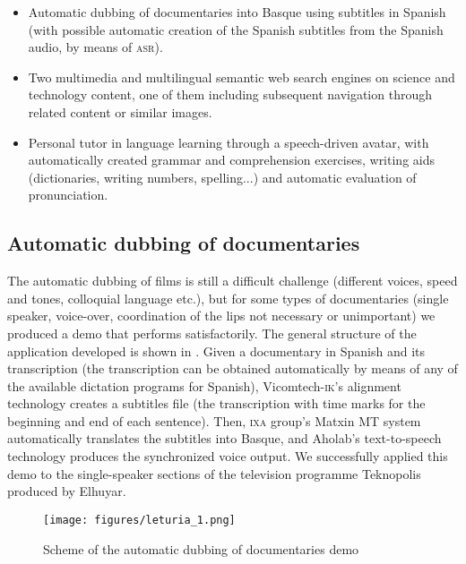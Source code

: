 \documentclass[output=paper]{LSP/langsci}
\begin{document}
\largerpage
\begin{itemize}
\item 
Automatic dubbing of documentaries into Basque using subtitles in Spanish (with possible automatic creation of the Spanish subtitles from the Spanish audio, by means of \textsc{asr}).
\item  
Two multimedia and multilingual semantic web search engines on science and technology content, one of them including subsequent navigation through related content or similar images.
\item 
Personal tutor in language learning through a speech-driven avatar, with automatically created grammar and comprehension exercises, writing aids (dictionaries, writing numbers, spelling...) and automatic evaluation of pronunciation.
\end{itemize}

\subsection{Automatic dubbing of documentaries}\label{sec:leturia:5.1}

The automatic dubbing of films is still a difficult challenge (different voices, speed and tones, colloquial language etc.), but for some types of documentaries (single speaker, voice-over, coordination of the lips not necessary or unimportant) we produced a demo that performs satisfactorily. The general structure of the application developed is shown in . Given a documentary in Spanish and its transcription (the transcription can be obtained automatically by means of any of the available dictation programs for Spanish), Vicomtech-\textsc{ik}'s alignment technology creates a subtitles file (the transcription with time marks for the beginning and end of each sentence). Then, \textsc{ixa} group's Matxin MT system automatically translates the subtitles into Basque, and Aholab's text-to-speech technology produces the synchronized voice output. We successfully applied this demo to the single-speaker sections of the television programme Teknopolis produced by Elhuyar.

\begin{figure}[h]
\texttt{[image: figures/leturia\_1.png]}
\caption{Scheme of the automatic dubbing of documentaries demo}
\label{fig:leturia:1}
\end{figure} 

\end{document}

